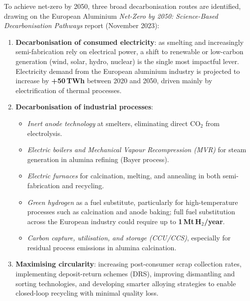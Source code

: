 To achieve net-zero by 2050, three broad decarbonisation routes are identified, drawing on the
European Aluminium \textit{Net-Zero by 2050: Science-Based Decarbonisation Pathways} report
(November 2023):

\begin{enumerate}[label=\arabic*.]
    \item \textbf{Decarbonisation of consumed electricity}: as smelting and increasingly
          semi-fabrication rely on electrical power, a shift to renewable or low-carbon generation
          (wind, solar, hydro, nuclear) is the single most impactful lever. Electricity demand from
          the European aluminium industry is projected to increase by \textbf{+50\,TWh} between
          2020 and 2050, driven mainly by electrification of thermal processes.

    \item \textbf{Decarbonisation of industrial processes}:
    \begin{itemize}
        \item \textit{Inert anode technology} at smelters, eliminating direct CO$_2$ from
              electrolysis.
        \item \textit{Electric boilers and Mechanical Vapour Recompression (MVR)} for steam
              generation in alumina refining (Bayer process).
        \item \textit{Electric furnaces} for calcination, melting, and annealing in both
              semi-fabrication and recycling.
        \item \textit{Green hydrogen} as a fuel substitute, particularly for high-temperature
              processes such as calcination and anode baking; full fuel substitution across the
              European industry could require up to \textbf{1\,Mt\,H$_2$/year}.
        \item \textit{Carbon capture, utilisation, and storage (CCU/CCS)}, especially for
              residual process emissions in alumina calcination.
    \end{itemize}

    \item \textbf{Maximising circularity}: increasing post-consumer scrap collection rates,
          implementing deposit-return schemes (DRS), improving dismantling and sorting
          technologies, and developing smarter alloying strategies to enable closed-loop recycling
          with minimal quality loss.
\end{enumerate}

